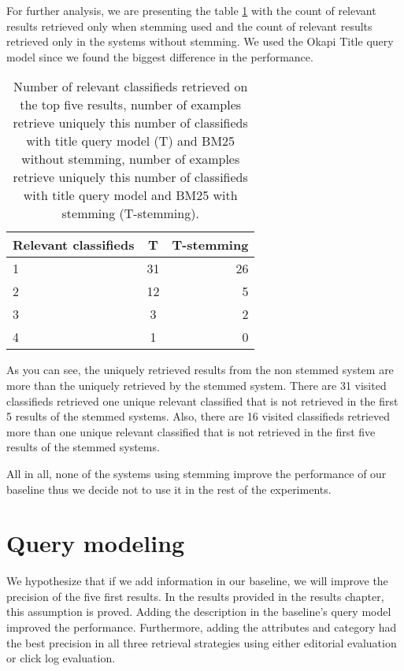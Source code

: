 For further analysis, we are presenting the table \ref{table:stemmRelIrrel} with the count of relevant results retrieved only when stemming used and the count of relevant results retrieved only in the systems without stemming. We used the Okapi Title query model since we found the biggest difference in the performance.

\begin{table}[h]
\begin{center}
\caption{Number of relevant classifieds retrieved on the top five results, number of examples retrieve uniquely this number of classifieds with title query model (T) and BM25 without stemming, number of examples retrieve uniquely this number of classifieds with title query model and BM25 with stemming (T-stemming).}
\label{table:stemmRelIrrel}
\begin{tabular}{lcr}
\midrule
Relevant classifieds & T & T-stemming \\
\midrule
	1 & 31 & 26 \\
	2 & 12 & 5  \\
	3 & 3 & 2 \\
	4 & 1 & 0  \\
\bottomrule
\end{tabular}
\end{center}
\end{table}


As you can see, the uniquely retrieved results from the non stemmed system are more than the uniquely retrieved by the stemmed system. There are 31 visited classifieds retrieved one unique relevant classified that is not retrieved in the first 5 results of the stemmed systems. Also, there are 16 visited classifieds retrieved more than one unique relevant classified that is not retrieved in the first five results of the stemmed systems.

All in all, none of the systems using stemming improve the performance of our baseline thus we decide not to use it in the rest of the experiments.

\section{Query modeling}

We hypothesize that if we add information in our baseline, we will improve the precision of the five first results. In the results provided in the results chapter, this assumption is proved. Adding the description in the baseline's query model improved the performance. Furthermore, adding the attributes and category had the best precision in all three retrieval strategies using either editorial evaluation or click log evaluation.

